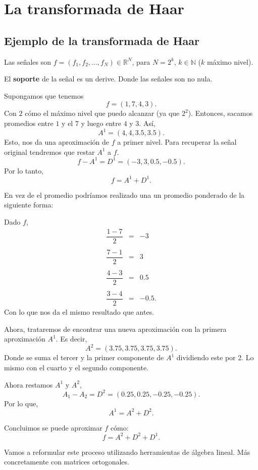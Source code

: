 \chapter{La transformada de Haar}
\section{Ejemplo de la transformada de Haar}
Las señales son $f=\left(f_1,f_2,\ldots,f_N\right)\in \mathbb{R}^N$, para $N=2^k$, $k\in \mathbb{N}$ ($k$ máximo nivel).

El \textbf{soporte} de la señal es un derive. Donde las señales son no nula.

Supongamos que tenemos 
$$f=(1,7,4,3).$$
Con $2$ cómo el máximo nivel que puedo alcanzar (ya que $2^2$). Entonces, sacamos promedios entre $1$ y el $7$ y luego entre $4$ y $3$. Así,
$$A^1=(4,4,3.5,3.5).$$
Esto, nos da una aproximación de $f$ a primer nivel. Para recuperar la señal original tendremos que restar $A^1$ a $f$.
$$f-A^1=D^1=(-3,3,0.5,-0.5).$$
Por lo tanto,
$$f=A^1+D^1.$$

En vez de el promedio podríamos realizado una un promedio ponderado de la siguiente forma:

Dado $f$,
$$
\begin{array}{rcl}
    \dfrac{1-7}{2} &=& -3\\\\
    \dfrac{7-1}{2} &=& 3\\\\
    \dfrac{4-3}{2} &=& 0.5\\\\
    \dfrac{3-4}{2} &=& -0.5.
\end{array}
$$
Con lo que nos da el mismo resultado que antes.

Ahora, trataremos de encontrar una nueva aproximación con la primera aproximación $A^1$. Es decir,
$$A^2=(3.75,3.75,3.75,3.75).$$
Donde se suma el tercer y la primer componente de $A^1$ dividiendo este por 2. Lo mismo con el cuarto y el segundo componente.

Ahora restamos $A^1$ y $A^2$,
$$A_1-A_ 2= D^2=(0.25,0.25,-0.25,-0.25).$$
Por lo que,
$$A^1=A^2+D^2.$$

Concluimos se puede aproximar $f$ cómo:
$$f=A^2+D^2+D^1.$$

Vamos a reformular este proceso utilizando herramientas de álgebra lineal. Más concretamente con matrices ortogonales.


